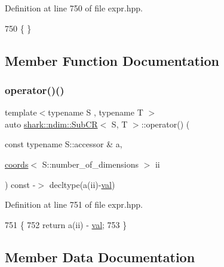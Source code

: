 Definition at line 750 of file expr.\+hpp.


\begin{DoxyCode}
750 \{ \}
\end{DoxyCode}


\subsection{Member Function Documentation}
\hypertarget{classshark_1_1ndim_1_1_sub_c_r_a3b17c915ccc097280f935b41283798be}{}\label{classshark_1_1ndim_1_1_sub_c_r_a3b17c915ccc097280f935b41283798be} 
\subsubsection{\texorpdfstring{operator()()}{operator()()}}
{\footnotesize\ttfamily template$<$typename S , typename T $>$ \\
auto \hyperlink{classshark_1_1ndim_1_1_sub_c_r}{shark\+::ndim\+::\+Sub\+CR}$<$ S, T $>$\+::operator() (\begin{DoxyParamCaption}\item[{const typename S\+::accessor \&}]{a,  }\item[{\hyperlink{structshark_1_1ndim_1_1coords}{coords}$<$ S\+::number\+\_\+of\+\_\+dimensions $>$}]{ii }\end{DoxyParamCaption}) const -\/$>$ decltype(a(ii)-\/\hyperlink{classshark_1_1ndim_1_1_sub_c_r_a4fe6be3ba612e66b26384ef24f389852}{val}) \hspace{0.3cm}{\ttfamily [inline]}}



Definition at line 751 of file expr.\+hpp.


\begin{DoxyCode}
751                                                                                                            
                   \{
752                 \textcolor{keywordflow}{return} a(ii) - \hyperlink{classshark_1_1ndim_1_1_sub_c_r_a4fe6be3ba612e66b26384ef24f389852}{val};
753             \}
\end{DoxyCode}


\subsection{Member Data Documentation}
\hypertarget{classshark_1_1ndim_1_1_sub_c_r_a4fe6be3ba612e66b26384ef24f389852}{}\label{classshark_1_1ndim_1_1_sub_c_r_a4fe6be3ba612e66b26384ef24f389852} 

